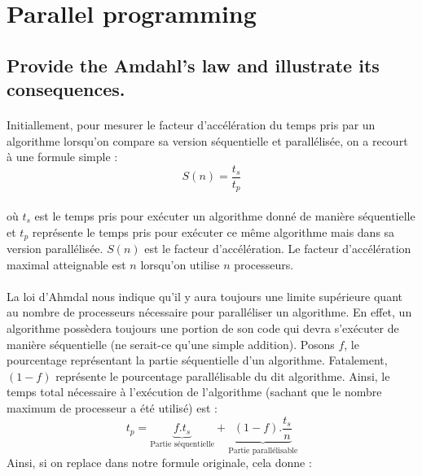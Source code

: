 \section{Parallel programming}
\subsection{Provide the Amdahl’s law and illustrate its consequences.}
\paragraph{}
Initiallement, pour mesurer le facteur d'accélération du temps pris par un algorithme lorsqu'on compare sa version séquentielle et parallélisée, on a recourt à une formule simple : 
\begin{equation}
S(n) = \frac{t_{s}}{t_{p}}
\end{equation}
\paragraph{}
où $t_{s}$ est le temps pris pour exécuter un algorithme donné de manière séquentielle et $t_{p}$ représente le temps pris pour exécuter ce même algorithme mais dans sa version parallélisée. $S(n)$ est le facteur d'accélération. Le facteur d'accélération maximal atteignable est $n$ lorsqu'on utilise $n$ processeurs. 

\paragraph{}
La loi d'Ahmdal nous indique qu'il y aura toujours une limite supérieure quant au nombre de processeurs nécessaire pour paralléliser un algorithme. En effet, un algorithme possèdera toujours une portion de son code qui devra s'exécuter de manière séquentielle (ne serait-ce qu'une simple addition). Posons $f$, le pourcentage représentant la partie séquentielle d'un algorithme. Fatalement, $(1-f)$ représente le pourcentage parallélisable du dit algorithme. Ainsi, le temps total nécessaire à l'exécution de l'algorithme (sachant que le nombre maximum de processeur a été utilisé) est :
\begin{equation*}
t_{p} = \underbrace{f . t_{s}}_\text{Partie séquentielle} +  \underbrace{(1-f) . \frac{t_{s}}{n}}_\text{Partie parallélisable}
\end{equation*}
Ainsi, si on replace dans notre formule originale, cela donne : 
